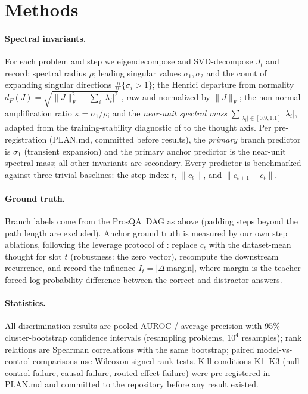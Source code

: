 \documentclass[11pt]{article}
\newcommand{\cthought}[1]{c_{#1}}
\newcommand{\Jt}{J_t}
\newcommand{\prosqa}{ProsQA}
\newcommand{\sigmaone}{\sigma_1}
\newcommand{\henrici}{d_F}
\begin{document}
\section{Methods}
\label{sec:methods}

\paragraph{Spectral invariants.} For each problem and step we eigendecompose and
SVD-decompose $\Jt$ and record: spectral radius $\rho$; leading singular values
$\sigmaone,\sigma_2$ and the count of expanding singular directions
$\#\{\sigma_i>1\}$; the Henrici departure from normality
$\henrici(J)=\sqrt{\lVert J\rVert_F^2-\sum_i\lvert\lambda_i\rvert^2}$
\citep{henrici1962bounds}, raw and normalized by $\lVert J\rVert_F$; the non-normal
amplification ratio $\kappa=\sigmaone/\rho$; and the \emph{near-unit spectral mass}
$\sum_{\lvert\lambda_i\rvert\in[0.9,1.1]}\lvert\lambda_i\rvert$, adapted from the
training-stability diagnostic of \citet{kim2026rksp} to the thought axis. Per
pre-registration (PLAN.md, committed before results), the \emph{primary} branch
predictor is $\sigmaone$ (transient expansion) and the primary anchor predictor is the
near-unit spectral mass; all other invariants are secondary. Every predictor is
benchmarked against three trivial baselines: the step index $t$, $\lVert\cthought{t}\rVert$,
and $\lVert\cthought{t+1}-\cthought{t}\rVert$.

\paragraph{Ground truth.} Branch labels come from the \prosqa\ DAG as above (padding
steps beyond the path length are excluded). Anchor ground truth is measured by our own
step ablations, following the leverage protocol of \citet{li2026dynamics}: replace
$\cthought{t}$ with the dataset-mean thought for slot $t$ (robustness: the zero vector),
recompute the downstream recurrence, and record the influence
$I_t=\lvert\Delta\,\text{margin}\rvert$, where margin is the teacher-forced log-probability
difference between the correct and distractor answers.

\paragraph{Statistics.} All discrimination results are pooled AUROC / average precision
with 95\% cluster-bootstrap confidence intervals (resampling problems, $10^4$
resamples); rank relations are Spearman correlations with the same bootstrap; paired
model-vs-control comparisons use Wilcoxon signed-rank tests. Kill conditions K1--K3
(null-control failure, causal failure, routed-effect failure) were pre-registered in
PLAN.md and committed to the repository before any result existed.
\end{document}
